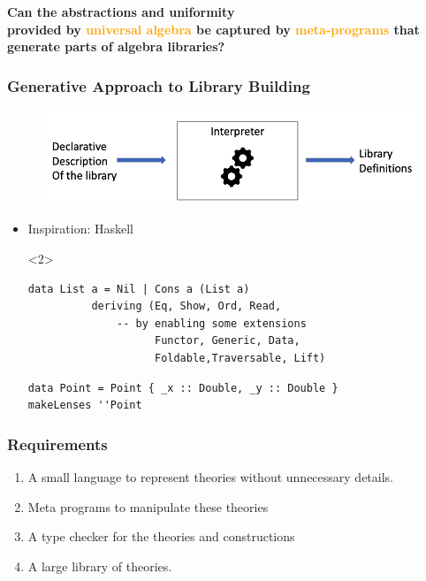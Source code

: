 \documentclass[t,10pt,numbers,fleqn,usenames,xcolor=dvipsnames]{beamer}
\begin{document}
\begin{frame}%
\vfill 
\begin{center}
\Large{\textbf{
Can the abstractions and uniformity \\
provided by \textcolor{Orange}{universal algebra} be captured by 
\textcolor{Orange}{meta-programs} 
that generate parts of algebra libraries? }}
\end{center}
\vfill 
\end{frame}


\begin{frame}[fragile]
\frametitle{Generative Approach to Library Building}
\begin{figure}
    \includegraphics[scale=0.3]{figures/interpreter_small.png}
\end{figure}
\pause
\begin{itemize}
    \item Inspiration: Haskell  
\begin{onlyenv}<2>
    \begin{verbatim}
data List a = Nil | Cons a (List a) 
          deriving (Eq, Show, Ord, Read,
              -- by enabling some extensions 
                    Functor, Generic, Data,         
                    Foldable,Traversable, Lift)
    \end{verbatim}
    \vspace{0.5cm}
    \begin{verbatim}
data Point = Point { _x :: Double, _y :: Double }
makeLenses ''Point  
     \end{verbatim}
\end{onlyenv}     
\end{itemize}
\end{frame}

\begin{frame}[fragile]
\frametitle{Requirements}
\begin{enumerate}
\item A small language to represent theories without unnecessary details. 
\item Meta programs to manipulate these theories  
\item A type checker for the theories and constructions 
\item A large library of theories.
\end{enumerate}
\end{frame}
\end{document}

